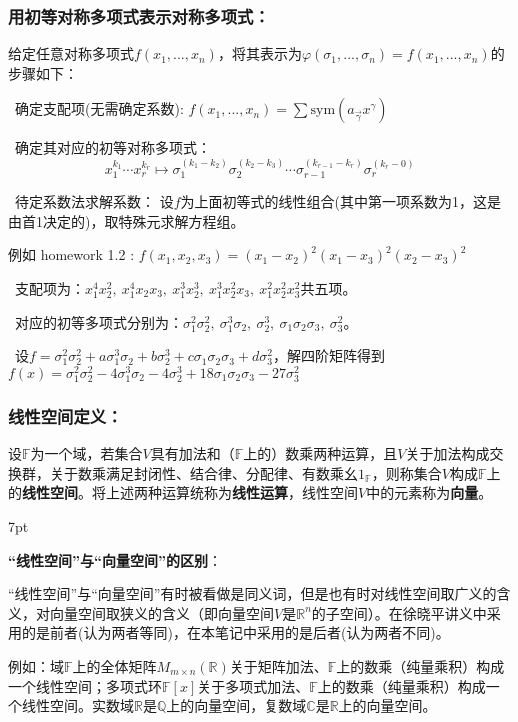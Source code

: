 \documentclass[zihao=5,UTF8]{report}
\theoremstyle{mystyle} %
\newenvironment{graybox}{%
\def\FrameCommand{%
\hspace{1pt}%
{\color{gray}\small \vrule width 2pt}%
{\color{graybox_color}\vrule width 4pt}%
\colorbox{graybox_color}%
}%
\MakeFramed{\advance\hsize-\width\FrameRestore}%
\noindent\hspace{-4.55pt}%
\begin{adjustwidth}{}{7pt}%
\vspace{2pt}\vspace{2pt}%
}
{%
\vspace{2pt}\end{adjustwidth}\endMakeFramed%
}
\begin{document}
\subsubsection{用初等对称多项式表示对称多项式：}
给定任意对称多项式$f(x_1,...,x_n)$，将其表示为$\varphi(\sigma_1,...,\sigma_n) = f(x_1,...,x_n)$的步骤如下：
\par
{}\ 确定支配项(无需确定系数): $f(x_1,...,x_n) = \sum \text{sym}(a_{\vec{\gamma}}x^{\gamma})$\par
{}\  确定其对应的初等对称多项式：
\begin{equation*}
    x_1^{k_1}\cdots x_r^{k_r} \longmapsto \sigma_1^{(k_1-k_2)}\sigma_2^{(k_2-k_3)} \cdots \sigma_{r-1}^{(k_{r-1}-k_r)}\sigma_{r}^{(k_{r}-0)}
\end{equation*}
 \par
{}\  待定系数法求解系数： 设$f$为上面初等式的线性组合(其中第一项系数为1，这是由首1决定的)，取特殊元求解方程组。  \par
{\par\color{gray}\small
例如 homework 1.2 :
$f(x_1,x_2,x_3) = (x_1 - x_2)^2(x_1-x_3)^2(x_2-x_3)^2$\par
{}\ 支配项为：$x_1^4x_2^2,\ x_1^4x_2x_3,\ x_1^3x_2^3,\ x_1^3x_2^2x_3,\ x_1^2x_2^2x_3^2$共五项。\par
{}\ 对应的初等多项式分别为：$\sigma_1^2\sigma_2^2,\ \sigma_1^3\sigma_2,\ \sigma_2^3,\ \sigma_1\sigma_2\sigma_3,\ \sigma_3^2$。\par
{}\ 设$f = \sigma_1^2\sigma_2^2+a\sigma_1^3\sigma_2+b\sigma_2^3+c\sigma_1\sigma_2\sigma_3+d\sigma_3^2$，解四阶矩阵得到$f(x) =  \sigma_1^2\sigma_2^2-4\sigma_1^3\sigma_2-4\sigma_2^3+18\sigma_1\sigma_2\sigma_3-27\sigma_3^2$
\par
\par}

 

\subsubsection{线性空间定义：}
设$\mathbb{F}$为一个域，若集合$V$具有加法和（$\mathbb{F}$上的）数乘两种运算，且$V$关于加法构成交换群，关于数乘满足封闭性、结合律、分配律、有数乘幺$1_{\mathbb{F}}$，则称集合$V$构成$\mathbb{F}$上的\textbf{线性空间}。将上述两种运算统称为\textbf{线性运算}，线性空间$V$中的元素称为\textbf{向量}。
\begin{graybox}
    \textbf{“线性空间”与“向量空间”的区别}：\par
    “线性空间”与“向量空间”有时被看做是同义词，但是也有时对线性空间取广义的含义，对向量空间取狭义的含义（即向量空间$V$是$\mathbb{R}^n$的子空间）。在徐晓平讲义中采用的是前者(认为两者等同)，在本笔记中采用的是后者(认为两者不同)。
\end{graybox}
{\color{gray}\small  例如：域$\mathbb{F}$上的全体矩阵$M_{m\times n}(\mathbb{R})$关于矩阵加法、$\mathbb{F}$上的数乘（纯量乘积）构成一个线性空间；多项式环$\mathbb{F}[x]$关于多项式加法、$\mathbb{F}$上的数乘（纯量乘积）构成一个线性空间。实数域$\mathbb{R}$是$\mathbb{Q}$上的向量空间，复数域$\mathbb{C}$是$\mathbb{R}$上的向量空间。
}
\end{document}
